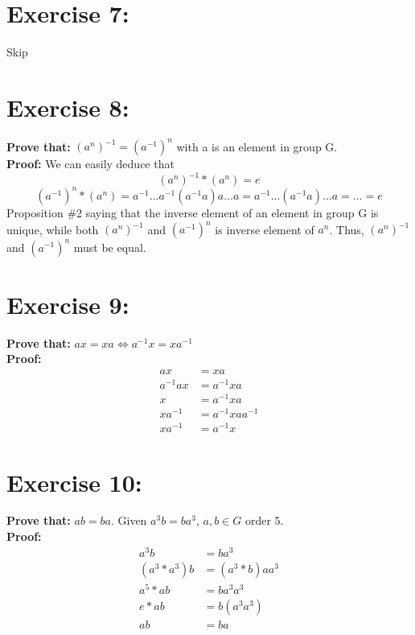 \documentclass{article}
\begin{document}
	\section{Exercise 7:} Skip
	
	\section{Exercise 8:}
		\textbf{Prove that:} $(a^n)^{-1} = (a^{-1})^n$ with a is an element in group G.\\
		\textbf{Proof:}
		We can easily deduce that
		\begin{equation*}
			(a^n)^{-1} * (a^n) = e\tag{1}
		\end{equation*}
		\begin{equation*}
			(a^{-1})^n * (a^n) = a^{-1}...a^{-1}(a^{-1}a)a...a = a^{-1}...(a^{-1}a)...a = ... = e\tag{2}
		\end{equation*}
		Proposition \#2 saying that the inverse element of an element in group G is unique, while both $(a^n)^{-1}$ and $(a^{-1})^n$ is inverse element of $a^n$. Thus, $(a^n)^{-1}$ and $(a^{-1})^n$ must be equal.
	
	\section{Exercise 9:}
		\textbf{Prove that:} $ax=xa \iff a^{-1}x=xa^{-1}$\\
		\textbf{Proof:}
			\begin{align*}
				ax &= xa\\
				a^{-1}ax &= a^{-1}xa\\
				x &= a^{-1}xa\\
				xa^{-1} &= a^{-1}xaa^{-1}\\
				xa^{-1} &= a^{-1}x\tag{Q.E.D}
			\end{align*}
	
	\section{Exercise 10:}
		\textbf{Prove that:} $ab=ba$. Given $a^3b=ba^3$, $a,b \in G$ order 5.\\
		\textbf{Proof:}
		\begin{align*}
			a^3b &= ba^3\\
			(a^3*a^3)b &= (a^3*b)aa^3\\
			a^5*ab &= ba^3a^3\\
			e*ab &= b(a^3a^3)\\
			ab &= ba\tag{Q.E.D}
		\end{align*}
	
\end{document}
